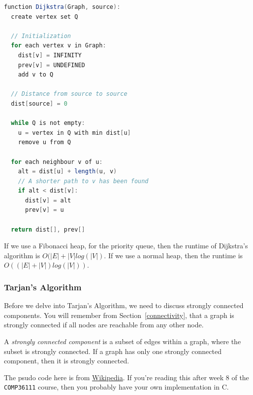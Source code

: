 
\begin{lstlisting}[language=java,
                  caption=Dijkstra's algorithm (from Wikipedia),
                  label=lst:dijkstra,
                  captionpos=b]
function Dijkstra(Graph, source):
  create vertex set Q

  // Initialization
  for each vertex v in Graph:
    dist[v] = INFINITY
    prev[v] = UNDEFINED
    add v to Q

  // Distance from source to source
  dist[source] = 0

  while Q is not empty:
    u = vertex in Q with min dist[u]
    remove u from Q 

  for each neighbour v of u:
    alt = dist[u] + length(u, v)
    // A shorter path to v has been found
    if alt < dist[v]:
      dist[v] = alt 
      prev[v] = u 

  return dist[], prev[]
\end{lstlisting}


If we use a Fibonacci heap, for the priority queue, then the runtime of
Dijkstra's algorithm is $O(|E| + |V|log(|V|)$. If we use a normal heap, then the
runtime is $O((|E|+|V|)log(|V|))$.

\subsubsection{Tarjan's Algorithm}

Before we delve into Tarjan's Algorithm, we need to discuss strongly connected
components. You will remember from Section~\ref{connectivity}, that a graph is
strongly connected if all nodes are reachable from any other node.

A \textit{strongly connected component} is a subset of edges within a graph,
where the subset is strongly connected. If a graph has only one strongly
connected component, then it is strongly connected.

The psudo code here is from
\href{https://en.wikipedia.org/wiki/Tarjan%27s_strongly_connected_components_algorithm}{Wikipedia}.
If you're reading this after week 8 of the \texttt{COMP36111} course, then you
probably have your own implementation in C.

